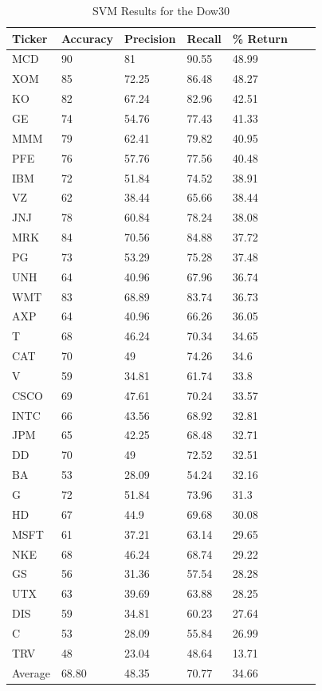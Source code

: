 \documentclass{article}
\begin{document}
\begin{table}[h!]
  \begin{tabular}{@{}lllllll@{}}
    \toprule
    Ticker & Accuracy & Precision & Recall & \% Return & \\ \midrule
    MCD & 90 & 81 & 90.55 & 48.99 & \\
    XOM & 85 & 72.25 & 86.48 & 48.27 & \\
    KO & 82 & 67.24 & 82.96 & 42.51 & \\
    GE & 74 & 54.76 & 77.43 & 41.33 & \\
    MMM & 79 & 62.41 & 79.82 & 40.95 & \\
    PFE & 76 & 57.76 & 77.56 & 40.48 & \\
    IBM & 72 & 51.84 & 74.52 & 38.91 & \\
    VZ & 62 & 38.44 & 65.66 & 38.44 & \\
    JNJ & 78 & 60.84 & 78.24 & 38.08 & \\
    MRK & 84 & 70.56 & 84.88 & 37.72 & \\
    PG & 73 & 53.29 & 75.28 & 37.48 & \\
    UNH & 64 & 40.96 & 67.96 & 36.74 & \\
    WMT & 83 & 68.89 & 83.74 & 36.73 & \\
    AXP & 64 & 40.96 & 66.26 & 36.05 & \\
    T & 68 & 46.24 & 70.34 & 34.65 & \\
    CAT & 70 & 49 & 74.26 & 34.6 & \\
    V & 59 & 34.81 & 61.74 & 33.8 & \\
    CSCO & 69 & 47.61 & 70.24 & 33.57 & \\
    INTC & 66 & 43.56 & 68.92 & 32.81 & \\
    JPM & 65 & 42.25 & 68.48 & 32.71 & \\
    DD & 70 & 49 & 72.52 & 32.51 & \\
    BA & 53 & 28.09 & 54.24 & 32.16 & \\
    G & 72 & 51.84 & 73.96 & 31.3 & \\
    HD & 67 & 44.9 & 69.68 & 30.08 & \\
    MSFT & 61 & 37.21 & 63.14 & 29.65 & \\
    NKE & 68 & 46.24 & 68.74 & 29.22 & \\
    GS & 56 & 31.36 & 57.54 & 28.28 & \\
    UTX & 63 & 39.69 & 63.88 & 28.25 & \\
    DIS & 59 & 34.81 & 60.23 & 27.64 & \\
    C & 53 & 28.09 & 55.84 & 26.99 & \\
    TRV & 48 & 23.04 & 48.64 & 13.71 & \\ \bottomrule
    Average & 68.80 & 48.35 & 70.77 & 34.66 & \\
  \end{tabular}
  \caption{SVM Results for the Dow30}
  \label{my-label}
\end{table}
\end{document}
